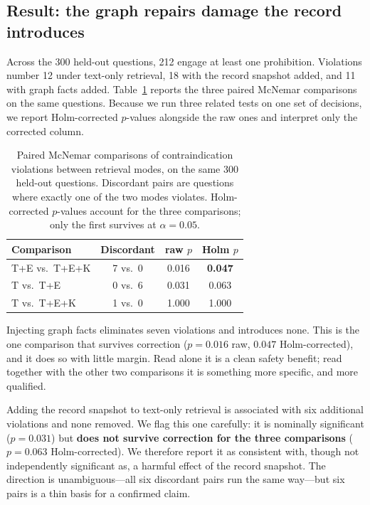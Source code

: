 \subsection{Result: the graph repairs damage the record introduces}

Across the 300 held-out questions, 212 engage at least one prohibition.
Violations number 12 under text-only retrieval, 18 with the record snapshot
added, and 11 with graph facts added. Table~\ref{tab:kg-violation} reports the
three paired McNemar comparisons on the same questions. Because we run three
related tests on one set of decisions, we report Holm-corrected $p$-values
alongside the raw ones and interpret only the corrected column.

\begin{table}[t]
\centering
\footnotesize
\setlength{\tabcolsep}{5pt}
\caption{Paired McNemar comparisons of contraindication violations between retrieval modes, on the same 300 held-out questions. Discordant pairs are questions where exactly one of the two modes violates. Holm-corrected $p$-values account for the three comparisons; only the first survives at $\alpha = 0.05$.}
\label{tab:kg-violation}
\begin{tabular}{lccc}
\toprule
Comparison & Discordant & raw $p$ & Holm $p$ \\
\midrule
T+E vs.\ T+E+K & 7 vs.\ 0 & 0.016 & \textbf{0.047} \\
T vs.\ T+E     & 0 vs.\ 6 & 0.031 & 0.063 \\
T vs.\ T+E+K   & 1 vs.\ 0 & 1.000 & 1.000 \\
\bottomrule
\end{tabular}
\end{table}

Injecting graph facts eliminates seven violations and introduces none. This
is the one comparison that survives correction ($p = 0.016$ raw, $0.047$
Holm-corrected), and it does so with little margin. Read alone it is a clean
safety benefit; read together with the other two comparisons it is something
more specific, and more qualified.

Adding the record snapshot to text-only retrieval is associated with six
additional violations and none removed. We flag this one carefully: it is
nominally significant ($p = 0.031$) but \textbf{does not survive correction for
the three comparisons} ($p = 0.063$ Holm-corrected). We therefore report it as
consistent with, though not independently significant as, a harmful effect of
the record snapshot. The direction is unambiguous---all six discordant pairs
run the same way---but six pairs is a thin basis for a confirmed claim.

